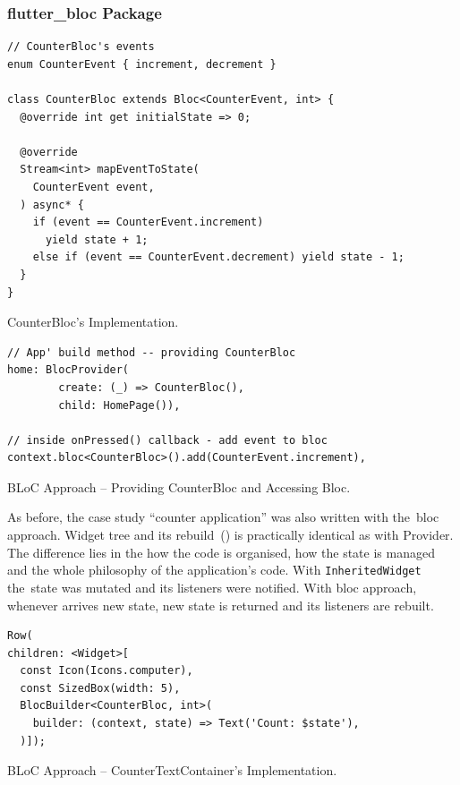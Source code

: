 \subsubsection{flutter\_bloc Package}
\begin{listing}[ht]
\begin{verbatim}
// CounterBloc's events
enum CounterEvent { increment, decrement }

class CounterBloc extends Bloc<CounterEvent, int> {
  @override int get initialState => 0;

  @override
  Stream<int> mapEventToState(
    CounterEvent event,
  ) async* {
    if (event == CounterEvent.increment)
      yield state + 1;
    else if (event == CounterEvent.decrement) yield state - 1;
  }
}
\end{verbatim}
\caption{CounterBloc's Implementation.}
\label{listing:counter-bloc-bloc}
\end{listing}

\begin{listing}[ht]
\begin{verbatim}
// App' build method -- providing CounterBloc
home: BlocProvider(
        create: (_) => CounterBloc(),
        child: HomePage()),
        
// inside onPressed() callback - add event to bloc
context.bloc<CounterBloc>().add(CounterEvent.increment),
\end{verbatim}
\caption{BLoC Approach -- Providing CounterBloc and Accessing Bloc.}
\label{listing:counter-bloc-homepage}
\end{listing}

As before, the case study ``counter application'' was also written with the~\gls{bloc} approach. Widget tree and its rebuild~() is practically identical as with Provider. The difference lies in the how the code is organised, how the state is managed and the whole philosophy of the application's code. With \verb|InheritedWidget| the~state was mutated and its listeners were notified. With \gls{bloc} approach, whenever arrives new state, new state is returned and its listeners are rebuilt. 

\begin{listing}[ht]
\begin{verbatim}
Row(
children: <Widget>[
  const Icon(Icons.computer),
  const SizedBox(width: 5),
  BlocBuilder<CounterBloc, int>(
    builder: (context, state) => Text('Count: $state'),
  )]);
\end{verbatim}
\caption{BLoC Approach -- CounterTextContainer's Implementation.}
\label{listing:counter-bloc-counter-text}
\end{listing}

